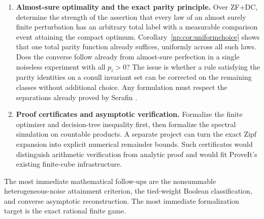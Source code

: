 \documentclass[11pt,a4paper]{article}
\theoremstyle{definition}
\theoremstyle{remark}
\begin{document}
\begin{enumerate}[label=\textbf{Q\arabic*.},ref=Q\arabic*,leftmargin=12mm]
\item\label{np:q:choice} \textbf{Almost-sure optimality and the exact parity principle.}
Over ZF+DC, determine the strength of the assertion that every law of an
almost surely finite perturbation has an arbitrary total label with a
measurable comparison event attaining the compact optimum.
Corollary~\ref{np:cor:uniformchoice} shows that one total parity function
already suffices, uniformly across all such laws. Does the converse follow
already from almost-sure perfection in a single noiseless experiment with
all $p_i>0$? The issue is whether a rule satisfying the parity identities
on a conull invariant set can be corrected on the remaining classes
without additional choice. Any formulation must respect the separations
already proved by Serafin \cite{serafin}.

\item\label{np:q:certificates} \textbf{Proof certificates and asymptotic verification.}
Formalize the finite optimizer and decision-tree inequality first,
then formalize the spectral simulation on countable products.
A separate project can turn the exact Zipf expansion into explicit
numerical remainder bounds. Such certificates would distinguish
arithmetic verification from analytic proof and would fit ProveIt's
existing finite-cube infrastructure.
\end{enumerate}

The most immediate mathematical follow-ups are the nonsummable
heterogeneous-noise attainment criterion, the tied-weight Boolean
classification, and converse asymptotic reconstruction. The most immediate
formalization target is the exact rational finite game.
\end{document}
